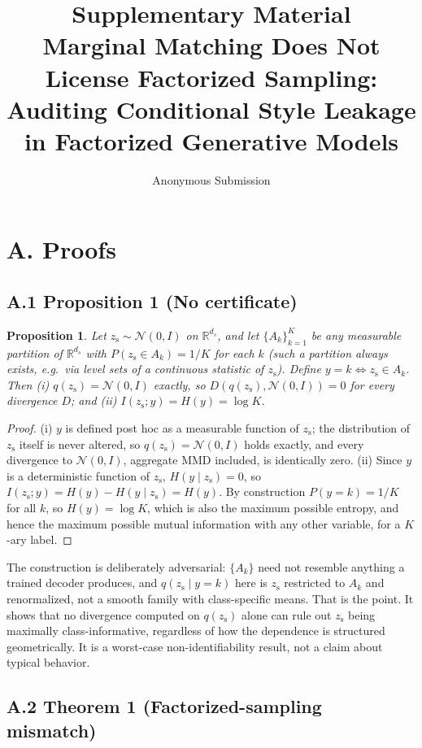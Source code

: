 \documentclass[letterpaper]{article} %
\title{Supplementary Material\\
Marginal Matching Does Not License Factorized Sampling:\\
Auditing Conditional Style Leakage in Factorized Generative Models}
\author{Anonymous Submission}
\newtheorem{proposition}{Proposition}
\newcommand{\zs}{z_{\mathrm{s}}}
\newcommand{\R}{\mathbb{R}}
\begin{document}
\maketitle

\section{A. Proofs}

\subsection{A.1 Proposition 1 (No certificate)}

\begin{proposition}
Let $\zs\sim\mathcal N(0,I)$ on $\R^{d_s}$, and let $\{A_k\}_{k=1}^K$ be any
measurable partition of $\R^{d_s}$ with $P(\zs\in A_k)=1/K$ for each $k$
(such a partition always exists, e.g.\ via level sets of a continuous
statistic of $\zs$). Define $y=k \iff \zs\in A_k$. Then (i) $q(\zs)=\mathcal
N(0,I)$ exactly, so $D(q(\zs),\mathcal N(0,I))=0$ for every divergence $D$;
and (ii) $I(\zs;y)=H(y)=\log K$.
\end{proposition}

\begin{proof}
(i) $y$ is defined post hoc as a measurable function of $\zs$; the
distribution of $\zs$ itself is never altered, so $q(\zs)=\mathcal N(0,I)$
holds exactly, and every divergence to $\mathcal N(0,I)$, aggregate MMD
included, is identically zero. (ii) Since $y$ is a deterministic function of
$\zs$, $H(y\mid\zs)=0$, so $I(\zs;y)=H(y)-H(y\mid\zs)=H(y)$. By construction
$P(y=k)=1/K$ for all $k$, so $H(y)=\log K$, which is also the maximum
possible entropy, and hence the maximum possible mutual information with any
other variable, for a $K$-ary label.
\end{proof}

The construction is deliberately adversarial: $\{A_k\}$ need not resemble
anything a trained decoder produces, and $q(\zs\mid y{=}k)$ here is $\zs$
restricted to $A_k$ and renormalized, not a smooth family with class-specific
means. That is the point. It shows that no divergence computed on $q(\zs)$
alone can rule out $\zs$ being maximally class-informative, regardless of how
the dependence is structured geometrically. It is a worst-case
non-identifiability result, not a claim about typical behavior.

\subsection{A.2 Theorem 1 (Factorized-sampling mismatch)}
\end{document}
